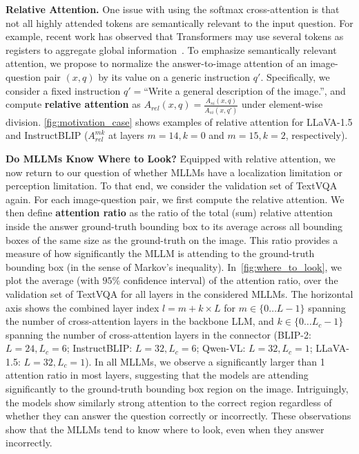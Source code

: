 \textbf{Relative Attention.} One issue with using the softmax cross-attention is that not all highly attended tokens are semantically relevant to the input question. For example, recent work has observed that Transformers may use several tokens as registers to aggregate global information~\citep{registers}. To emphasize semantically relevant attention, we propose to normalize the answer-to-image attention of an image-question pair $(x,q)$ by its value on a generic instruction $q'$. Specifically, we consider a fixed instruction $q'= $``Write a general description of the image.'', and compute \textbf{relative attention} as $A_{rel}(x,q) = \frac{A_{si}(x,q)}{A_{si}(x,q')}$ under element-wise division. \cref{fig:motivation_case} shows examples of relative attention for LLaVA-1.5 and InstructBLIP ($A^{mk}_{rel}$ at layers $m=14,k=0$ and $m=15, k=2$, respectively).

\textbf{Do MLLMs Know Where to Look?}
Equipped with relative attention, we now return to our question of whether MLLMs have a localization limitation or perception limitation. To that end, we consider the validation set of TextVQA again. For each image-question pair, we first compute the relative attention. We then define \textbf{attention ratio} as the ratio of the total (sum) relative attention inside the answer ground-truth bounding box to its average across all bounding boxes of the same size as the ground-truth on the image. This ratio provides a measure of how significantly the MLLM is attending to the ground-truth bounding box (in the sense of Markov's inequality).
In~\cref{fig:where_to_look}, we plot the average (with $95\%$ confidence interval) of the attention ratio, over the validation set of TextVQA for all layers in the considered MLLMs. The horizontal axis shows the combined layer index $l = m + k \times L$ for $m \in \{0\dots L-1\}$ spanning the number of cross-attention layers in the backbone LLM, and $k \in \{0\dots L_c-1\}$ spanning the number of cross-attention layers in the connector (BLIP-2: $L=24, L_c=6$; InstructBLIP: $L=32, L_c=6$; Qwen-VL: $L=32, L_c=1$; LLaVA-1.5: $L=32, L_c=1$).
In all MLLMs, we observe a significantly larger than 1 attention ratio in most layers, suggesting that the models are attending significantly to the ground-truth bounding box region on the image. Intriguingly, the models show similarly strong attention to the correct region regardless of whether they can answer the question correctly or incorrectly. These observations show that the MLLMs tend to know where to look, even when they answer incorrectly.